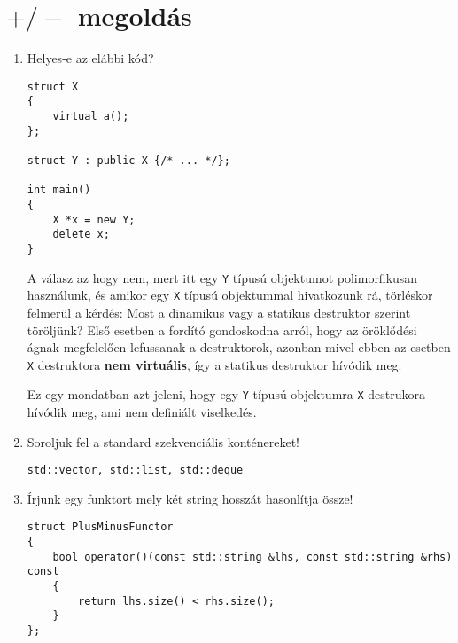 \documentclass[a4paper,11.5pt]{article}
\begin{document}
	\section{$+/-$ megoldás}
	\begin{enumerate}
		\item  Helyes-e az elábbi kód?
		
		\begin{lstlisting}
struct X
{
	virtual a();
};

struct Y : public X {/* ... */};

int main()
{
	X *x = new Y;
	delete x;
}
		\end{lstlisting}
		
		A válasz az hogy nem, mert itt egy \texttt{Y} típusú objektumot polimorfikusan használunk, és amikor egy \texttt{X} típusú objektummal hivatkozunk rá, törléskor felmerül a kérdés: Most a dinamikus vagy a statikus destruktor szerint töröljünk? Első esetben a fordító gondoskodna arról, hogy az öröklődési ágnak megfelelően lefussanak a destruktorok, azonban mivel ebben az esetben \texttt{X} destruktora \textbf{nem virtuális}, így a statikus destruktor hívódik meg. 
		
		Ez egy mondatban azt jeleni, hogy egy \texttt{Y} típusú objektumra \texttt{X} destrukora hívódik meg, ami nem definiált viselkedés.
		
		\item Soroljuk fel a standard szekvenciális konténereket!
		
		\texttt{std::vector, std::list, std::deque}
		\item Írjunk egy funktort mely két string hosszát hasonlítja össze!
		\begin{lstlisting}
struct PlusMinusFunctor
{
	bool operator()(const std::string &lhs, const std::string &rhs) const
	{
		return lhs.size() < rhs.size();
	}
};
		\end{lstlisting}
	\end{enumerate}
\end{document}
